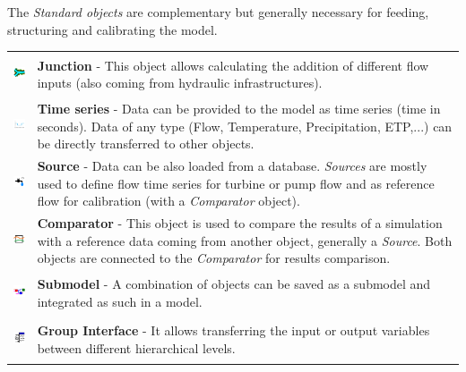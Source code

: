 \documentclass[
  letterpaper,
  DIV=11,
  numbers=noendperiod]{scrreprt}
\begin{document}
The \emph{Standard objects} are complementary but generally necessary
for feeding, structuring and calibrating the model.

\begin{longtable}[]{@{}
  >{\raggedright\arraybackslash}p{}
  >{\raggedright\arraybackslash}p{}@{}}
\toprule()
\endhead
\includegraphics[width=0.44in,height=0.44in]{./figures/fig-icon_object_junction.png}
& \textbf{Junction} - This object allows calculating the addition of
different flow inputs (also coming from hydraulic infrastructures). \\
\includegraphics[width=0.44in,height=0.44in]{./figures/fig-icon_object_timeseries.png}
& \textbf{Time series} - Data can be provided to the model as time
series (time in seconds). Data of any type (Flow, Temperature,
Precipitation, ETP,...) can be directly transferred to other objects. \\
\includegraphics[width=0.44in,height=0.44in]{./figures/fig-icon_object_source.png}
& \textbf{Source} - Data can be also loaded from a database.
\emph{Sources} are mostly used to define flow time series for turbine or
pump flow and as reference flow for calibration (with a
\emph{Comparator} object). \\
\includegraphics[width=0.44in,height=0.44in]{./figures/fig-icon_object_comparator.png}
& \textbf{Comparator} - This object is used to compare the results of a
simulation with a reference data coming from another object, generally a
\emph{Source}. Both objects are connected to the \emph{Comparator} for
results comparison. \\
\includegraphics[width=0.44in,height=0.44in]{./figures/fig-icon_object_submodel.png}
& \textbf{Submodel} - A combination of objects can be saved as a
submodel and integrated as such in a model. \\
\includegraphics[width=0.44in,height=0.44in]{./figures/fig-icon_object_group_inter.png}
& \textbf{Group Interface} - It allows transferring the input or output
variables between different hierarchical levels. \\
\bottomrule()
\end{longtable}
\end{document}
